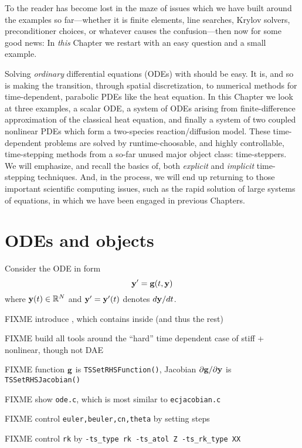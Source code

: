 
To the reader has become lost in the maze of issues which we have built around the examples so far---whether it is finite elements, line searches, Krylov solvers, preconditioner choices, or whatever causes the confusion---then now for some good news:  In \emph{this} Chapter we restart with an easy question and a small example.

Solving \emph{ordinary} differential equations (ODEs) with \PETSc should be easy.  It is, and so is making the transition, through spatial discretization, to numerical methods for time-dependent, parabolic PDEs like the heat equation.  In this Chapter we look at three examples, a scalar ODE, a system of ODEs arising from finite-difference approximation of the classical heat equation, and finally a system of two coupled nonlinear PDEs which form a two-species reaction/diffusion model.  These time-dependent problems are solved by runtime-choosable, and highly controllable, time-stepping methods from a so-far unused major \PETSc object class: \pTS time-steppers.  We will emphasize, and recall the basics of, both \emph{explicit} and \emph{implicit} time-stepping techniques.  And, in the process, we will end up returning to those important scientific computing issues, such as the rapid solution of large systems of equations, in which we have been engaged in previous Chapters.


\section{ODEs and \PETSc \pTS objects}

Consider the ODE in form
\begin{equation}
\mathbf{y}' = \mathbf{g}(t,\mathbf{y}) \label{eq:ts:ode}
\end{equation}
where $\mathbf{y}(t) \in \mathbb{R}^N$ and $\mathbf{y}'=\mathbf{y}'(t)$ denotes $d\mathbf{y}/dt$.

FIXME introduce \pTS, which contains \pSNES inside (and thus the rest)

FIXME build all tools around the ``hard'' time dependent case of stiff + nonlinear, though not DAE

FIXME function $\mathbf{g}$ is \texttt{TSSetRHSFunction()}, Jacobian $\partial \mathbf{g}/\partial \mathbf{y}$ is \texttt{TSSetRHSJacobian()}

FIXME show \texttt{ode.c}, which is most similar to \texttt{ecjacobian.c}

FIXME control \texttt{euler,beuler,cn,theta} by setting steps

FIXME control \texttt{rk} by \texttt{-ts\_type rk -ts\_atol Z -ts\_rk\_type XX}


